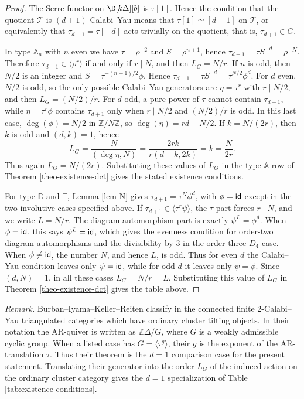 \documentclass[12pt]{article}
\theoremstyle{plain}
\theoremstyle{definition}
\DeclareMathOperator{\id}{\sf id}
\newcommand{\Db}[1][]{\D[#1][b]}
\newcommand{\T}{\mathcal{T}}
\begin{document}
\begin{proof}
The Serre functor on \(\Db[k\Delta]\) is \(\tau[1]\).  Hence the
condition that the quotient \(\T\) is \((d+1)\)-Calabi--Yau means that
\(\tau[1]\simeq[d+1]\) on \(\T\), or equivalently that \(\tau_{d+1}=\tau[-d]\) acts
trivially on the quotient, that is, \(\tau_{d+1}\in G\).

In type \(\mathbb A_n\) with \(n\) even we have \(\tau=\rho^{-2}\) and
\(S=\rho^{n+1}\), hence \(\tau_{d+1}=\tau S^{-d}=\rho^{-N}\).  Therefore
\(\tau_{d+1}\in\langle\rho^r\rangle\) if and only if \(r\mid N\), and then
\(L_G=N/r\).  If \(n\) is odd, then \(N/2\) is an integer and
\(S=\tau^{-(n+1)/2}\phi\).  Hence
\(\tau_{d+1}=\tau S^{-d}=\tau^{N/2}\phi^d\). 
For \(d\) even, \(N/2\) is odd, so the only possible Calabi--Yau generators are
\(\eta=\tau^r\) with \(r\mid N/2\), and then \(L_G=(N/2)/r\).  For \(d\) odd,
a pure power of \(\tau\) cannot contain \(\tau_{d+1}\), while
\(\eta=\tau^r\phi\) contains \(\tau_{d+1}\) only when \(r\mid N/2\) and
\((N/2)/r\) is odd.  In this last case, \(\deg(\phi)=N/2\) in
\(\mathbb Z/N\mathbb Z\), so \(\deg(\eta)=rd+N/2\).  If
\(k=N/(2r)\), then \(k\) is odd and \((d,k)=1\), hence
\[
L_G=\frac{N}{(\deg\eta, N)}=\frac{2rk}{r(d+k,2k)}=k=\frac{N}{2r}.
\]
Thus again \(L_G=N/(2r)\).  Substituting these values of \(L_G\) in the type
\(\mathbb A\) row of Theorem
\ref{theo-existence-dct} gives the stated existence conditions.

For type \(\mathbb D\) and \(\mathbb E\), Lemma \ref{lem-N} gives
\(\tau_{d+1}=\tau^N\phi^d\), with \(\phi=\id\) except in the two involutive cases
specified above.  If \(\tau_{d+1}\in\langle\tau^r\psi\rangle\), the \(\tau\)-part
forces \(r\mid N\), and we write \(L=N/r\).  The diagram-automorphism part
is exactly \(\psi^L=\phi^d\).
When \(\phi=\id\), this says \(\psi^L=\id\), which gives the evenness
condition for order-two diagram automorphisms and the divisibility by \(3\) in
the order-three \(D_4\) case.  When \(\phi\neq\id\), the number \(N\), and
hence \(L\), is odd.  Thus for even \(d\) the Calabi--Yau condition leaves
only \(\psi=\id\), while for odd \(d\) it leaves only \(\psi=\phi\).  Since
\((d,N)=1\), in all these cases \(L_G=N/r=L\).  Substituting this value of
\(L_G\) in Theorem \ref{theo-existence-dct} gives the table above.
\end{proof}



\noindent 
{\it Remark.} Burban--Iyama--Keller--Reiten classify in \cite[Theorem A.2]{Burban2008aa}
the connected finite \(2\)-Calabi--Yau triangulated categories which have
ordinary cluster tilting objects.  In their notation the AR-quiver is written
as \(\mathbb Z\Delta/G\), where \(G\) is a weakly admissible cyclic group. When a listed case has
\(G=\langle\tau^g\rangle\), their \(g\) is the exponent of the AR-translation
\(\tau\).  Thus their theorem is the \(d=1\) comparison case for the present
statement.  Translating their generator into the order \(L_G\) of the induced
action on the ordinary cluster category gives the \(d=1\) specialization of
Table \ref{tab:existence-conditions}.
\end{document}
